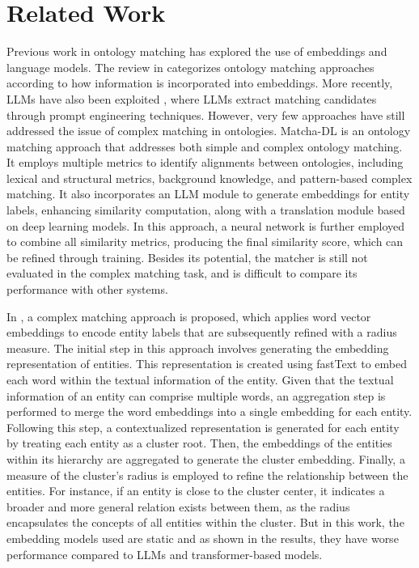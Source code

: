 \section{Related Work}
\label{sec:related_work}

Previous work in ontology matching has explored the use of embeddings and language models. The review in \cite{DBLP:conf/semweb/SousaLT22} categorizes ontology matching approaches according to how information is incorporated into embeddings. More recently, LLMs have also been exploited \cite{10.1145/3587259.3627571,DBLP:conf/adbis/PeetersB23,DBLP:journals/pvldb/ZeakisPSK23,DBLP:journals/vldb/LiLSDT23}, where LLMs extract matching candidates through prompt engineering techniques. However, very few approaches have still addressed the issue of complex matching in ontologies. Matcha-DL \cite{DBLP:conf/om2/FariaSCFBP23} is an ontology matching approach that addresses both simple and complex ontology matching. It employs multiple metrics to identify alignments between ontologies, including lexical and structural metrics, background knowledge, and pattern-based complex matching. It also incorporates an LLM module to generate embeddings for entity labels, enhancing similarity computation, along with a translation module based on deep learning models. In this approach, a neural network is further employed to combine all similarity metrics, producing the final similarity score, which can be refined through training. Besides its potential, the matcher is still not evaluated in the complex matching task, and is difficult to compare its performance with other systems. 

In \cite{DBLP:conf/i-semantics/DhouibFT19,DBLP:journals/jodsn/DhouibFT21}, a complex matching approach is proposed, which applies word vector embeddings to encode entity labels that are subsequently refined with a radius measure. The initial step in this approach involves generating the embedding representation of entities. This representation is created using fastText \cite{DBLP:journals/tacl/BojanowskiGJM17} to embed each word within the textual information of the entity. Given that the textual information of an entity can comprise multiple words, an aggregation step is performed to merge the word embeddings into a single embedding for each entity. Following this step, a contextualized representation is generated for each entity by treating each entity as a cluster root. Then, the embeddings of the entities within its hierarchy are aggregated to generate the cluster embedding. Finally, a measure of the cluster's radius is employed to refine the relationship between the entities. For instance, if an entity is close to the cluster center, it indicates a broader and more general relation exists between them, as the radius encapsulates the concepts of all entities within the cluster. But in this work, the embedding models used are static and as shown in the results, they have worse performance compared to LLMs and transformer-based models. 

